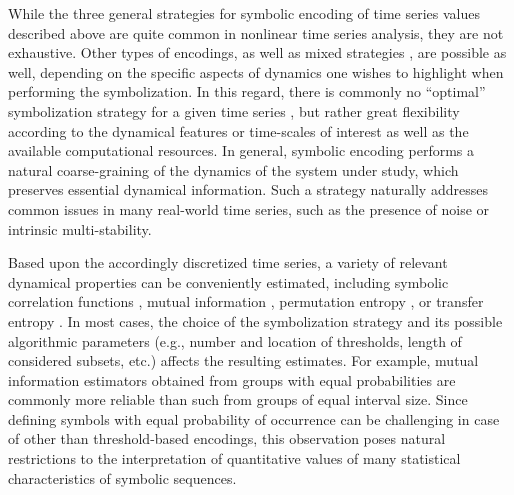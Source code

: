 While the three general strategies for symbolic encoding of time series values described above are quite common in nonlinear time series analysis, they are not exhaustive. Other types of encodings, as well as mixed strategies \cite{Donner2008}, are possible as well, depending on the specific aspects of dynamics one wishes to highlight when performing the symbolization. In this regard, there is commonly no ``optimal'' symbolization strategy for a given time series \cite{Bollt2001}, but rather great flexibility according to the dynamical features or time-scales of interest as well as the available computational resources. In general, symbolic encoding performs a natural coarse-graining of the dynamics of the system under study, which preserves essential dynamical information. Such a strategy naturally addresses common issues in many real-world time series, such as the presence of noise or intrinsic multi-stability. 

Based upon the accordingly discretized time series, a variety of relevant dynamical properties can be conveniently estimated, including symbolic correlation functions \cite{Lee1997}, mutual information \cite{Li1992}, permutation entropy \cite{Bandt2002}, or transfer entropy \cite{Staniek2008}. In most cases, the choice of the symbolization strategy and its possible algorithmic parameters (e.g., number and location of thresholds, length of considered subsets, etc.) affects the resulting estimates. For example, mutual information estimators obtained from groups with equal probabilities are commonly more reliable than such from groups of equal interval size. Since defining symbols with equal probability of occurrence can be challenging in case of other than threshold-based encodings, this observation poses natural restrictions to the interpretation of quantitative values of many statistical characteristics of symbolic sequences. 

